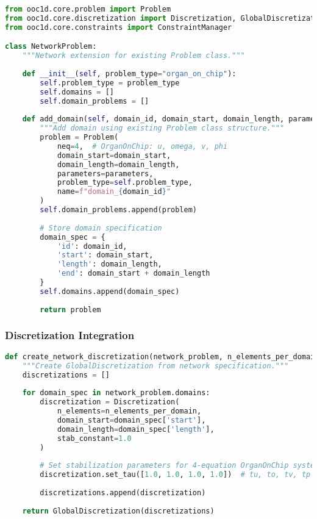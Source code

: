 \begin{lstlisting}[language=Python, caption=Problem Class Extension for Networks]
from ooc1d.core.problem import Problem
from ooc1d.core.discretization import Discretization, GlobalDiscretization
from ooc1d.core.constraints import ConstraintManager

class NetworkProblem:
    """Network extension for existing Problem class."""
    
    def __init__(self, problem_type="organ_on_chip"):
        self.problem_type = problem_type
        self.domains = []
        self.domain_problems = []
        
    def add_domain(self, domain_id, domain_start, domain_length, parameters):
        """Add domain using existing Problem class structure."""
        problem = Problem(
            neq=4,  # OrganOnChip: u, omega, v, phi
            domain_start=domain_start,
            domain_length=domain_length, 
            parameters=parameters,
            problem_type=self.problem_type,
            name=f"domain_{domain_id}"
        )
        self.domain_problems.append(problem)
        
        # Store domain specification
        domain_spec = {
            'id': domain_id,
            'start': domain_start,
            'length': domain_length,
            'end': domain_start + domain_length
        }
        self.domains.append(domain_spec)
        
        return problem
\end{lstlisting}

\subsubsection{Discretization Integration}

\begin{lstlisting}[language=Python, caption=Network Discretization]
def create_network_discretization(network_problem, n_elements_per_domain=10):
    """Create GlobalDiscretization from network specification."""
    discretizations = []
    
    for domain_spec in network_problem.domains:
        discretization = Discretization(
            n_elements=n_elements_per_domain,
            domain_start=domain_spec['start'],
            domain_length=domain_spec['length'],
            stab_constant=1.0
        )
        
        # Set stabilization parameters for 4-equation OrganOnChip system
        discretization.set_tau([1.0, 1.0, 1.0, 1.0])  # tu, to, tv, tp
        
        discretizations.append(discretization)
    
    return GlobalDiscretization(discretizations)
\end{lstlisting}

